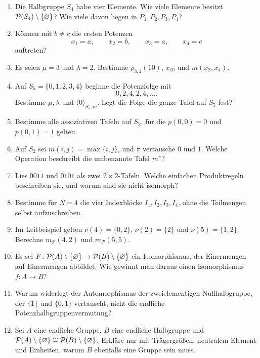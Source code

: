 \documentclass[main.tex]{subfiles}
\begin{document}
\begin{enumerate}
  \item Die Halbgruppe \(S_4\) habe vier Elemente.  Wie viele Elemente besitzt
    \(\mathcal{P}(S_4)\setminus\{\varnothing\}\)?  Wie viele davon liegen in \(P_1,P_2,P_3,P_4\)?

  \item Können mit \(b\neq c\) die ersten Potenzen
    \[
      x_1=a,\qquad x_2=b,\qquad x_3=a,\qquad x_4=c
    \]
    auftreten?

  \item Es seien \(\mu=3\) und \(\lambda=2\).  Bestimme
    \(\rho_{3,2}(10)\), \(x_{10}\) und \(m(x_2,x_4)\).

  \item Auf \(S_5=\{0,1,2,3,4\}\) beginne die Potenzfolge mit
    \[
      0,2,4,2,4,\ldots.
    \]
    Bestimme \(\mu,\lambda\) und \(\langle0\rangle_{S_5,m}\).  Legt die Folge die
    ganze Tafel auf \(S_5\) fest?

  \item Bestimme alle assoziativen Tafeln auf \(S_2\), für die
    \(p(0,0)=0\) und \(p(0,1)=1\) gelten.

  \item Auf \(S_2\) sei \(m(i,j)=\max\{i,j\}\), und \(\pi\) vertausche
    \(0\) und \(1\).  Welche Operation beschreibt die umbenannte Tafel
    \(m^\pi\)?

  \item Lies \(0011\) und \(0101\) als zwei \(2\times2\)-Tafeln.  Welche
    einfachen Produktregeln beschreiben sie, und warum sind sie nicht
    isomorph?

  \item Bestimme für \(N=4\) die vier Indexblöcke
    \(I_1,I_2,I_3,I_4\), ohne die Teilmengen selbst aufzuschreiben.

  \item Im Leitbeispiel gelten
    \(\nu(4)=\{0,2\}\), \(\nu(2)=\{2\}\) und
    \(\nu(5)=\{1,2\}\).  Berechne \(m_{\mathcal P}(4,2)\) und
    \(m_{\mathcal P}(5,5)\).

  \item Es sei \(F\colon\mathcal{P}(A)\setminus\{\varnothing\}\to\mathcal{P}(B)\setminus\{\varnothing\}\) ein Isomorphismus, der
    Einermengen auf Einermengen abbildet.  Wie gewinnt man daraus einen
    Isomorphismus \(f\colon A\to B\)?

  \item Warum widerlegt der Automorphismus der zweielementigen
    Nullhalbgruppe, der \(\{1\}\) und \(\{0,1\}\) vertauscht, nicht die
    endliche Potenzhalbgruppenvermutung?

  \item Sei \(A\) eine endliche Gruppe, \(B\) eine endliche Halbgruppe und
    \(\mathcal{P}(A)\setminus\{\varnothing\}\cong\mathcal{P}(B)\setminus\{\varnothing\}\).  Erkläre nur mit Trägergrößen, neutralem
    Element und Einheiten, warum \(B\) ebenfalls eine Gruppe sein muss.
\end{enumerate}
\end{document}
